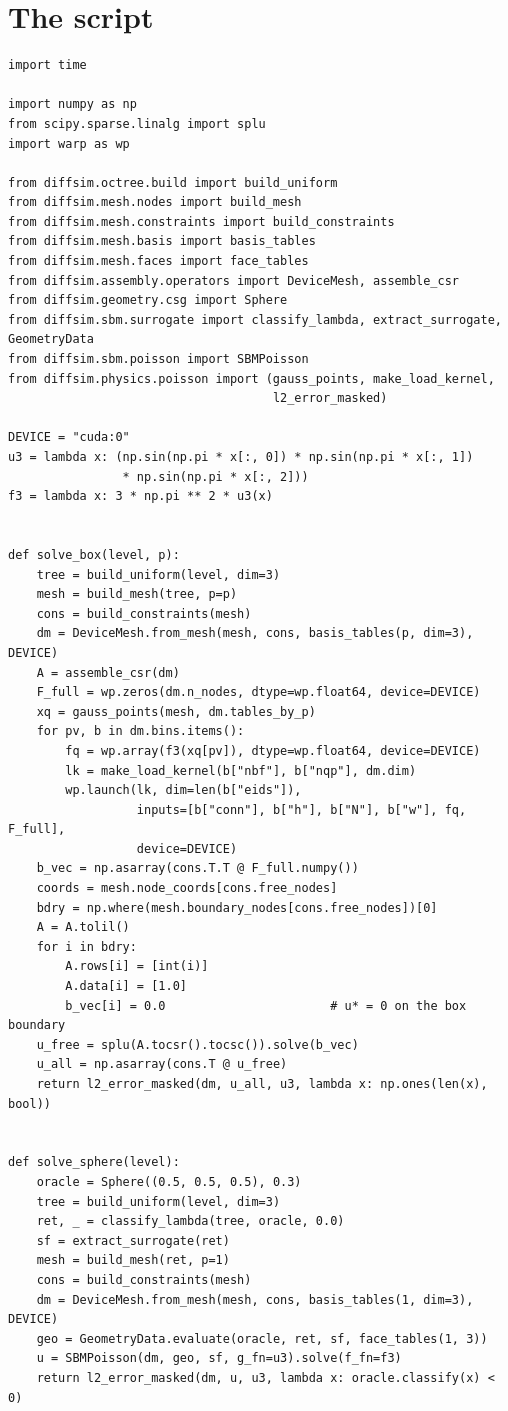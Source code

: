 \section*{The script}
\begin{lstlisting}
import time

import numpy as np
from scipy.sparse.linalg import splu
import warp as wp

from diffsim.octree.build import build_uniform
from diffsim.mesh.nodes import build_mesh
from diffsim.mesh.constraints import build_constraints
from diffsim.mesh.basis import basis_tables
from diffsim.mesh.faces import face_tables
from diffsim.assembly.operators import DeviceMesh, assemble_csr
from diffsim.geometry.csg import Sphere
from diffsim.sbm.surrogate import classify_lambda, extract_surrogate, GeometryData
from diffsim.sbm.poisson import SBMPoisson
from diffsim.physics.poisson import (gauss_points, make_load_kernel,
                                     l2_error_masked)

DEVICE = "cuda:0"
u3 = lambda x: (np.sin(np.pi * x[:, 0]) * np.sin(np.pi * x[:, 1])
                * np.sin(np.pi * x[:, 2]))
f3 = lambda x: 3 * np.pi ** 2 * u3(x)


def solve_box(level, p):
    tree = build_uniform(level, dim=3)
    mesh = build_mesh(tree, p=p)
    cons = build_constraints(mesh)
    dm = DeviceMesh.from_mesh(mesh, cons, basis_tables(p, dim=3), DEVICE)
    A = assemble_csr(dm)
    F_full = wp.zeros(dm.n_nodes, dtype=wp.float64, device=DEVICE)
    xq = gauss_points(mesh, dm.tables_by_p)
    for pv, b in dm.bins.items():
        fq = wp.array(f3(xq[pv]), dtype=wp.float64, device=DEVICE)
        lk = make_load_kernel(b["nbf"], b["nqp"], dm.dim)
        wp.launch(lk, dim=len(b["eids"]),
                  inputs=[b["conn"], b["h"], b["N"], b["w"], fq, F_full],
                  device=DEVICE)
    b_vec = np.asarray(cons.T.T @ F_full.numpy())
    coords = mesh.node_coords[cons.free_nodes]
    bdry = np.where(mesh.boundary_nodes[cons.free_nodes])[0]
    A = A.tolil()
    for i in bdry:
        A.rows[i] = [int(i)]
        A.data[i] = [1.0]
        b_vec[i] = 0.0                       # u* = 0 on the box boundary
    u_free = splu(A.tocsr().tocsc()).solve(b_vec)
    u_all = np.asarray(cons.T @ u_free)
    return l2_error_masked(dm, u_all, u3, lambda x: np.ones(len(x), bool))


def solve_sphere(level):
    oracle = Sphere((0.5, 0.5, 0.5), 0.3)
    tree = build_uniform(level, dim=3)
    ret, _ = classify_lambda(tree, oracle, 0.0)
    sf = extract_surrogate(ret)
    mesh = build_mesh(ret, p=1)
    cons = build_constraints(mesh)
    dm = DeviceMesh.from_mesh(mesh, cons, basis_tables(1, dim=3), DEVICE)
    geo = GeometryData.evaluate(oracle, ret, sf, face_tables(1, 3))
    u = SBMPoisson(dm, geo, sf, g_fn=u3).solve(f_fn=f3)
    return l2_error_masked(dm, u, u3, lambda x: oracle.classify(x) < 0)



\end{lstlisting}
